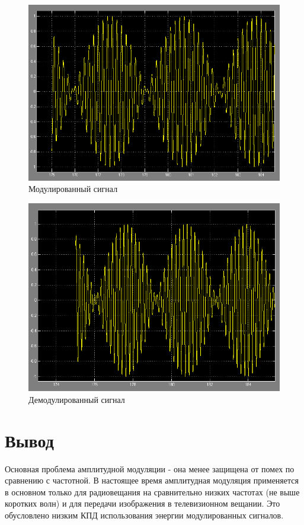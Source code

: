 
\begin{figure}[H]
   \includegraphics[scale=0.5]{lab7/Scope.png}
   \caption{Модулированный сигнал}
\end{figure}
\begin{figure}[H]
   \includegraphics[scale=0.5]{lab7/Scope3.png}
   \caption{Демодулированный сигнал}
\end{figure}



\section{Вывод}
Основная проблема амплитудной модуляции - она менее защищена от помех по сравнению с частотной. В настоящее время амплитудная модуляция применяется в основном только для радиовещания на сравнительно низких частотах (не выше коротких волн) и для передачи изображения в телевизионном вещании. Это обусловлено низким КПД использования энергии модулированных сигналов. 

